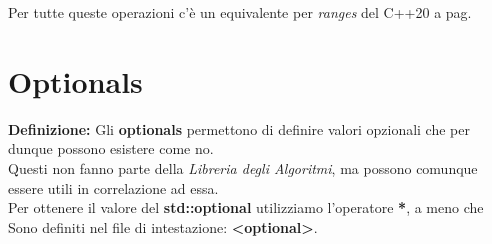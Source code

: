 \fleuron

\textsf{\small Per tutte queste operazioni c'è un equivalente per \emph{ranges} del C++20 a pag. \pageref{ranges_uninitialized_memory}} \\


\newpage

\label{optionals}

\section{Optionals}

\textsf{\small \textbf{Definizione: } Gli \textbf{optionals} permettono di definire valori opzionali che per dunque possono esistere come no.} \\

\textsf{\small Questi non fanno parte della \emph{Libreria degli Algoritmi}, ma possono comunque essere utili in correlazione ad essa.} \\

\textsf{\small Per ottenere il valore del \textbf{std::optional} utilizziamo l'operatore \textbf{*}, a meno che } \\

\textsf{\small Sono definiti nel file di intestazione: \textbf{<optional>}.} \\

